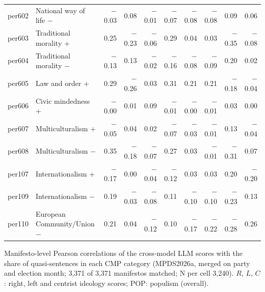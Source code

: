 \begin{table}[ht]
{\begin{tabular}{llrrrrrrrr}
per602 & National way of life $-$ & $-$0.03 & 0.08 & $-$0.01 & $-$0.07 & $-$0.08 & $-$0.08 & 0.09 & 0.06 \\
per603 & Traditional morality + & 0.25 & $-$0.23 & $-$0.06 & 0.29 & 0.04 & 0.03 & $-$0.35 & $-$0.08 \\
per604 & Traditional morality $-$ & $-$0.13 & 0.13 & $-$0.02 & $-$0.16 & $-$0.08 & $-$0.09 & 0.20 & 0.02 \\
per605 & Law and order + & 0.29 & $-$0.26 & 0.03 & 0.31 & 0.21 & 0.21 & $-$0.18 & $-$0.04 \\
per606 & Civic mindedness + & $-$0.00 & 0.01 & 0.09 & $-$0.01 & $-$0.00 & $-$0.01 & 0.03 & 0.00 \\
per607 & Multiculturalism + & $-$0.05 & 0.04 & 0.02 & $-$0.07 & $-$0.03 & $-$0.01 & 0.13 & $-$0.04 \\
per608 & Multiculturalism $-$ & 0.35 & $-$0.18 & $-$0.07 & 0.27 & 0.03 & $-$0.01 & $-$0.31 & 0.07 \\
per107 & Internationalism + & $-$0.17 & 0.00 & $-$0.04 & $-$0.12 & 0.03 & 0.03 & 0.20 & $-$0.20 \\
per109 & Internationalism $-$ & 0.19 & $-$0.03 & $-$0.08 & 0.11 & $-$0.10 & $-$0.10 & $-$0.23 & 0.13 \\
per110 & European Community/Union $-$ & 0.21 & 0.04 & $-$0.12 & 0.10 & $-$0.17 & $-$0.22 & $-$0.28 & 0.26 \\
\bottomrule
\end{tabular}}
\par\smallskip
\begin{minipage}{\linewidth}\scriptsize Manifesto-level Pearson correlations of the cross-model LLM scores with the share of quasi-sentences in each CMP category (MPDS2026a, merged on party and election month; 3,371 of 3,371 manifestos matched; N per cell 3,240). $R$, $L$, $C$: right, left and centrist ideology scores; POP: populism (overall).\end{minipage}
\end{table}

